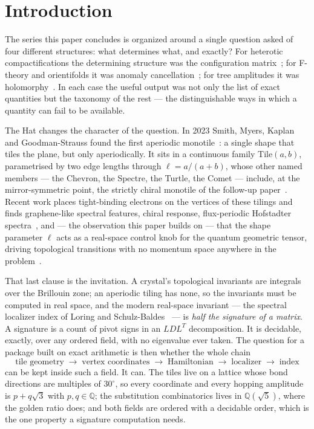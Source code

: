 \documentclass[11pt,a4paper]{article}
\newcommand{\QQ}{\mathbb{Q}}
\theoremstyle{definition}
\begin{document}
\section{Introduction}
\label{sec:intro}

The series this paper concludes is organized around a single question asked
of four different structures: what determines what, and exactly? For
heterotic compactifications the determining structure was the configuration
matrix~\cite{SuppMath}; for F-theory and orientifolds it was anomaly
cancellation~\cite{SuppStrings}; for tree amplitudes it was
holomorphy~\cite{SuppTwistor}. In each case the useful output was not only
the list of exact quantities but the taxonomy of the rest --- the
distinguishable ways in which a quantity can fail to be available.

The Hat changes the character of the question. In 2023 Smith, Myers, Kaplan
and Goodman-Strauss found the first aperiodic monotile~\cite{Smith2023a}: a
single shape that tiles the plane, but only aperiodically. It sits in a
continuous family Tile$(a,b)$, parametrised by two edge lengths through
$\ell = a/(a+b)$, whose other named members --- the Chevron, the Spectre,
the Turtle, the Comet --- include, at the mirror-symmetric point, the
strictly chiral monotile of the follow-up paper~\cite{Smith2023b}. Recent
work places tight-binding electrons on the vertices of these tilings and
finds graphene-like spectral features, chiral response, flux-periodic
Hofstadter spectra~\cite{Schirmann2024}, and --- the observation this paper
builds on --- that the shape parameter $\ell$ acts as a real-space control
knob for the quantum geometric tensor, driving topological transitions with
no momentum space anywhere in the problem~\cite{RocheCarrasco2025}.

That last clause is the invitation. A crystal's topological invariants are
integrals over the Brillouin zone; an aperiodic tiling has none, so the
invariants must be computed in real space, and the modern real-space
invariant --- the spectral localizer index of Loring and
Schulz-Baldes~\cite{Loring2015, LoringSchulzBaldes2017} --- is \emph{half the signature
of a matrix}. A signature is a count of pivot signs in an $LDL^T$
decomposition. It is decidable, exactly, over any ordered field, with no
eigenvalue ever taken. The question for a package built on exact arithmetic
is then whether the whole chain
%
\begin{equation}
\text{tile geometry} \;\to\; \text{vertex coordinates} \;\to\;
\text{Hamiltonian} \;\to\; \text{localizer} \;\to\; \text{index}
\label{eq:chain}
\end{equation}
%
can be kept inside such a field. It can. The tiles live on a lattice whose
bond directions are multiples of $30^\circ$, so every coordinate and every
hopping amplitude is $p + q\sqrt3$ with $p, q \in \QQ$; the substitution
combinatorics lives in $\QQ(\sqrt5)$, where the golden ratio does; and both
fields are ordered with a decidable order, which is the one property a
signature computation needs.
\end{document}

